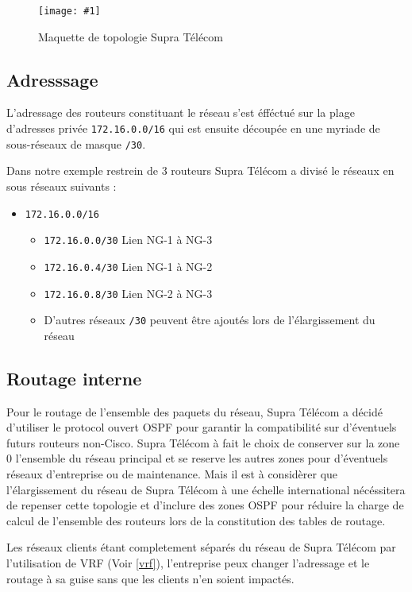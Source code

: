 \documentclass{article}
\newenvironment{figue}[1]{
	\par
	\bigskip
	\begin{figure}[h]
	\begin{center}
	  \texttt{[image: \#1]}
	\end{center}
}{
	\end{figure}
	\bigskip
}
\newcommand{\spr}{Supra Télécom\xspace}
\begin{document}
\begin{figue}{img/nuage-supra.pdf}
	\caption{Maquette de topologie \spr}
\end{figue}

\subsection{Adresssage}
\label{adressage}

L'adressage des routeurs constituant le réseau s'est éfféctué sur la plage d'adresses privée \texttt{172.16.0.0/16} qui est ensuite découpée en une myriade de sous-réseaux de masque \texttt{/30}.

Dans notre exemple restrein de 3 routeurs \spr a divisé le réseaux en sous réseaux suivants :

\bigskip

\begin{itemize}
	\item \texttt{172.16.0.0/16}
	\begin{itemize}
		\item \texttt{172.16.0.0/30} Lien NG-1 à NG-3
		\item \texttt{172.16.0.4/30} Lien NG-1 à NG-2
		\item \texttt{172.16.0.8/30} Lien NG-2 à NG-3
		\item D'autres réseaux \texttt{/30} peuvent être ajoutés lors de l'élargissement du réseau
	\end{itemize}
\end{itemize}

\bigskip

\subsection{Routage interne}

Pour le routage de l'ensemble des paquets du réseau, \spr a décidé d'utiliser le protocol ouvert OSPF pour garantir la compatibilité sur d'éventuels futurs routeurs non-Cisco.
\spr à fait le choix de conserver sur la zone 0 l'ensemble du réseau principal et se reserve les autres zones pour d'éventuels réseaux d'entreprise ou de maintenance.
Mais il est à considèrer que l'élargissement du réseau de \spr à une échelle international nécéssitera de repenser cette topologie et d'inclure des zones OSPF pour réduire la charge de calcul de l'ensemble des routeurs lors de la constitution des tables de routage.

Les réseaux clients étant completement séparés du réseau de \spr par l'utilisation de VRF (Voir \ref{vrf}), l'entreprise peux changer l'adressage et le routage à sa guise sans que les clients n'en soient impactés.
\end{document}
